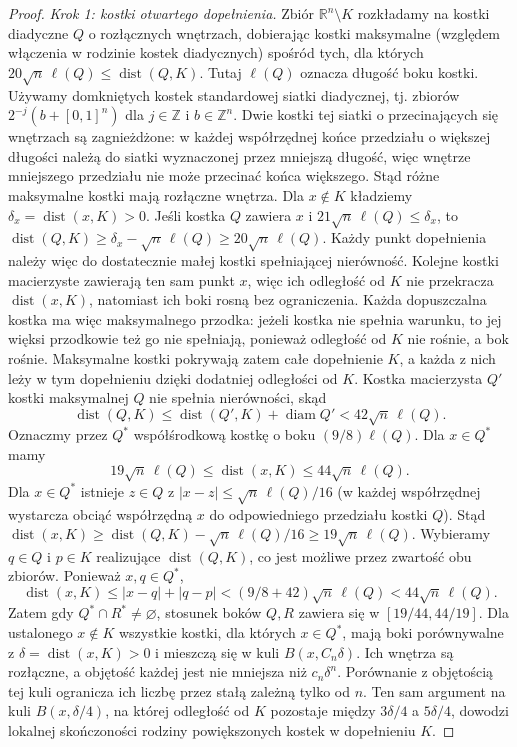 \begin{proof}
\emph{Krok 1: kostki otwartego dopełnienia.}
Zbiór $\mathbb R^n\setminus K$ rozkładamy na kostki
diadyczne $Q$ o rozłącznych wnętrzach, dobierając
kostki maksymalne (względem włączenia w rodzinie
kostek diadycznych) spośród tych, dla których
$20\sqrt n\,\ell(Q)\le\operatorname{dist}(Q,K)$.
Tutaj $\ell(Q)$ oznacza długość boku kostki.
Używamy domkniętych kostek standardowej siatki
diadycznej, tj. zbiorów $2^{-j}(b+[0,1]^n)$ dla
$j\in\mathbb Z$ i $b\in\mathbb Z^n$.
Dwie kostki tej siatki o przecinających się wnętrzach
są zagnieżdżone: w każdej współrzędnej końce przedziału
o większej długości należą do siatki wyznaczonej przez
mniejszą długość, więc wnętrze mniejszego przedziału
nie może przecinać końca większego. Stąd różne
maksymalne kostki mają rozłączne wnętrza.
Dla $x\notin K$ kładziemy $\delta_x=\operatorname{dist}(x,K)>0$.
Jeśli kostka $Q$ zawiera $x$ i
$21\sqrt n\,\ell(Q)\le\delta_x$, to
$\operatorname{dist}(Q,K)\ge\delta_x-\sqrt n\,\ell(Q)
\ge20\sqrt n\,\ell(Q)$.
Każdy punkt dopełnienia należy więc do dostatecznie
małej kostki spełniającej nierówność. Kolejne kostki
macierzyste zawierają ten sam punkt $x$, więc ich odległość
od $K$ nie przekracza $\operatorname{dist}(x,K)$, natomiast
ich boki rosną bez ograniczenia. Każda dopuszczalna kostka
ma więc maksymalnego przodka: jeżeli kostka nie spełnia
warunku, to jej więksi przodkowie też go nie spełniają,
ponieważ odległość od $K$ nie rośnie, a bok rośnie.
Maksymalne kostki pokrywają zatem całe dopełnienie $K$,
a każda z nich leży w tym dopełnieniu dzięki dodatniej
odległości od $K$. Kostka macierzysta $Q'$ kostki
maksymalnej $Q$ nie spełnia nierówności, skąd
\[
 \operatorname{dist}(Q,K)
 \le\operatorname{dist}(Q',K)+\operatorname{diam}Q'
 <42\sqrt n\,\ell(Q).
\]
Oznaczmy przez $Q^*$ współśrodkową kostkę o boku
$(9/8)\ell(Q)$. Dla $x\in Q^*$ mamy
\[
 19\sqrt n\,\ell(Q)\le\operatorname{dist}(x,K)
 \le44\sqrt n\,\ell(Q).
\]
Dla $x\in Q^*$ istnieje $z\in Q$ z
$|x-z|\le\sqrt n\,\ell(Q)/16$ (w każdej
współrzędnej wystarcza obciąć współrzędną $x$
do odpowiedniego przedziału kostki $Q$).
Stąd $\operatorname{dist}(x,K)\ge
\operatorname{dist}(Q,K)-\sqrt n\,\ell(Q)/16
\ge19\sqrt n\,\ell(Q)$.
Wybieramy $q\in Q$ i $p\in K$ realizujące
$\operatorname{dist}(Q,K)$, co jest możliwe
przez zwartość obu zbiorów. Ponieważ $x,q\in Q^*$,
\[
 \operatorname{dist}(x,K)\le |x-q|+|q-p|
 <(9/8+42)\sqrt n\,\ell(Q)
 <44\sqrt n\,\ell(Q).
\]
Zatem gdy $Q^*\cap R^*\ne\varnothing$, stosunek boków
$Q,R$ zawiera się w $[19/44,44/19]$.
Dla ustalonego $x\notin K$ wszystkie kostki, dla których
$x\in Q^*$, mają boki porównywalne z
$\delta=\operatorname{dist}(x,K)>0$ i mieszczą się
w kuli $B(x,C_n\delta)$. Ich wnętrza są rozłączne,
a objętość każdej jest nie mniejsza niż $c_n\delta^n$.
Porównanie z objętością tej kuli ogranicza ich liczbę
przez stałą zależną tylko od $n$. Ten sam argument na
kuli $B(x,\delta/4)$, na której odległość od $K$ pozostaje
między $3\delta/4$ a $5\delta/4$, dowodzi lokalnej
skończoności rodziny powiększonych kostek w dopełnieniu $K$.


\end{proof}
